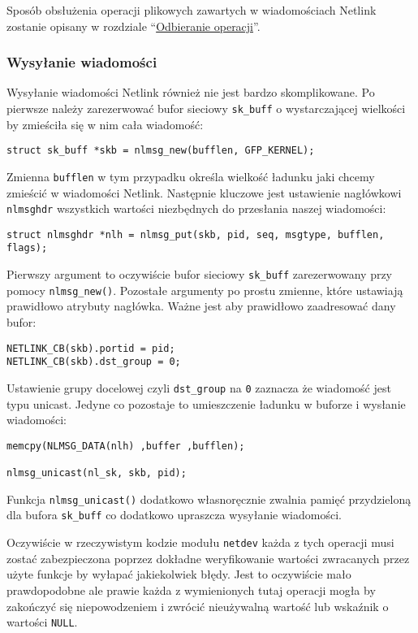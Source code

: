 \documentclass[10pt]{article}
\begin{document}
Sposób obsłużenia operacji plikowych zawartych w wiadomościach Netlink zostanie opisany w rozdziale ``\hyperref[odbieranie-operacji]{Odbieranie operacji}''.

\subsubsection{Wysyłanie wiadomości}

Wysyłanie wiadomości Netlink również nie jest bardzo skomplikowane. Po pierwsze należy zarezerwować bufor sieciowy \texttt{sk\_buff} o wystarczającej wielkości by zmieściła się w nim cała wiadomość:

\begin{verbatim}
struct sk_buff *skb = nlmsg_new(bufflen, GFP_KERNEL);
\end{verbatim}

Zmienna \texttt{bufflen} w tym przypadku określa wielkość ładunku jaki chcemy zmieścić w wiadomości Netlink. Następnie kluczowe jest ustawienie nagłówkowi \texttt{nlmsghdr} wszystkich wartości niezbędnych do przesłania naszej wiadomości:

\begin{verbatim}
struct nlmsghdr *nlh = nlmsg_put(skb, pid, seq, msgtype, bufflen, flags);
\end{verbatim}

Pierwszy argument to oczywiście bufor sieciowy \texttt{sk\_buff} zarezerwowany przy pomocy \texttt{nlmsg\_new()}. Pozostałe argumenty po prostu zmienne, które ustawiają prawidłowo atrybuty nagłówka. Ważne jest aby prawidłowo zaadresować dany bufor:

\begin{verbatim}
NETLINK_CB(skb).portid = pid;
NETLINK_CB(skb).dst_group = 0;
\end{verbatim}

Ustawienie grupy docelowej czyli \texttt{dst\_group} na \texttt{0} zaznacza że wiadomość jest typu unicast. Jedyne co pozostaje to umieszczenie ładunku w buforze i wysłanie wiadomości:

\begin{verbatim}
memcpy(NLMSG_DATA(nlh) ,buffer ,bufflen);

nlmsg_unicast(nl_sk, skb, pid);
\end{verbatim}

Funkcja \texttt{nlmsg\_unicast()} dodatkowo własnoręcznie zwalnia pamięć przydzieloną dla bufora \texttt{sk\_buff} co dodatkowo upraszcza wysyłanie wiadomości.

Oczywiście w rzeczywistym kodzie modułu \texttt{netdev} każda z tych operacji musi zostać zabezpieczona poprzez dokładne weryfikowanie wartości zwracanych przez użyte funkcje by wyłapać jakiekolwiek błędy.  Jest to oczywiście mało prawdopodobne ale prawie każda z wymienionych tutaj operacji mogła by zakończyć się niepowodzeniem i zwrócić nieużywalną wartość lub wskaźnik o wartości \texttt{NULL}.
\end{document}

